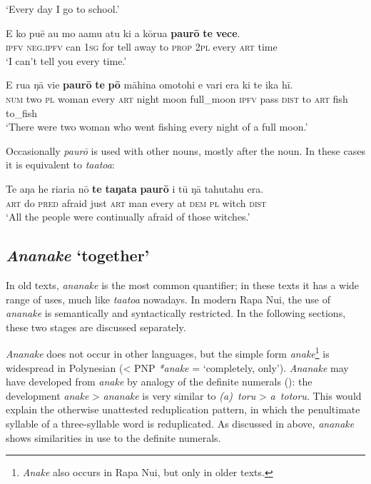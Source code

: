 \glt 
‘Every day I go to school.’ \textstyleExampleref{[R151.059]} 
\z

\ea\label{ex:4.60}
\gll E ko puē au mo {\ꞌ}a{\ꞌ}amu atu ki a kōrua \textbf{paurō} \textbf{te} \textbf{vece}. \\
\textsc{ipfv} \textsc{neg.ipfv} can \textsc{1sg} for tell away to \textsc{prop} \textsc{2pl} every \textsc{art} time \\

\glt 
‘I can’t tell you every time.’ \textstyleExampleref{[R201.009]} 
\z

\ea\label{ex:4.61}
\gll E rua ŋā vi{\ꞌ}e \textbf{paurō} \textbf{te} \textbf{pō} māhina {\ꞌ}omotohi e vari era  ki te ika hī.\\
\textsc{num} two \textsc{pl} woman every \textsc{art} night moon full\_moon \textsc{ipfv} pass \textsc{dist}  to \textsc{art} fish to\_fish\\

\glt
‘There were two woman who went fishing every night of a full moon.’ \textstyleExampleref{[R532-12.001]}
\z

Occasionally \textit{paurō} is used with other nouns, mostly after the noun. In these cases it is equivalent to \textit{ta{\ꞌ}ato{\ꞌ}a}:

\ea\label{ex:4.62}
\gll Te aŋa he ri{\ꞌ}ari{\ꞌ}a nō \textbf{te} \textbf{taŋata} \textbf{paurō} {\ꞌ}i tū ŋā tahutahu era. \\
\textsc{art} do \textsc{pred} afraid just \textsc{art} man every at \textsc{dem} \textsc{pl} witch \textsc{dist} \\

\glt 
‘All the people were continually afraid of those witches.’ \textstyleExampleref{[R233.007]} 
\z
{}
\subsection{\textit{Ananake} ‘together’}\label{sec:4.4.4}
In old texts, \textit{ananake} is the most common quantifier; in these texts it has a wide range of uses, much like \textit{ta{\ꞌ}ato{\ꞌ}a} nowadays. In modern Rapa Nui, the use of \textit{ananake} is semantically and syntactically restricted. In the following sections, these two stages are discussed separately.

\textit{Ananake} does not occur in other languages, but the simple form \textit{anake}\footnote{\label{fn:183}\textit{Anake} also occurs in Rapa Nui, but only in older texts.} is widespread in Polynesian ({\textless} PNP \textit{*anake} = ‘completely, only’). \textit{Ananake} may have developed from \textit{anake} by analogy of the definite numerals (): the development \textit{anake} {\textgreater} \textit{ananake} is very similar to \textit{(a)~toru} {\textgreater} \textit{a~totoru}. This would explain the otherwise unattested reduplication pattern, in which the penultimate syllable of a three-syllable word is reduplicated. As discussed in  above, \textit{ananake} shows similarities in use to the definite numerals.

